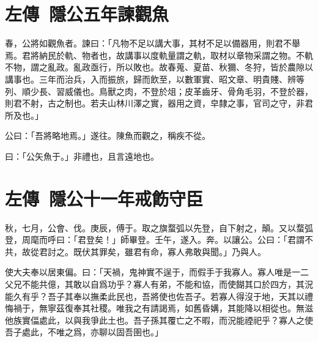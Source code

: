 \section[臧僖伯諫觀魚\quad{\small 左傳\ 隱公五年}]{{\normalsize 左傳\ 隱公五年}\quad {}諫觀魚}
春，公將如觀魚者。諫曰：「凡物不足以講大事，其材不足以備器用，則君不舉焉。君將納民於軌、物者也，故講事以度軌量謂之軌，取材以章物采謂之物。不軌不物，謂之亂政。亂政亟行，所以敗也。故春蒐、夏苗、秋獮、冬狩，皆於農隙以講事也。三年而治兵，入而振旅，歸而飲至，以數軍實、昭文章、明貴賤、辨等列、順少長、習威儀也。鳥獸之肉，不登於俎；皮革齒牙、骨角毛羽，不登於器，則{君}不射，古之制也。若夫山林川澤之實，器用之資，皁隸之事，官司之守，非君所及也。」

公曰：「吾將略地焉。」遂往。陳魚而觀之，稱疾不從。

曰：「公矢魚于。」非禮也，且言遠地也。

\theendnotes

\section[鄭莊公戒飭守臣\quad{\small 左傳\ 隱公十一年}]{{\normalsize 左傳\ 隱公十一年}\quad {}戒飭守臣}
秋，七月，公會、伐。庚辰，傅于。取之旗蝥弧以先登，自下射之，顛。又以蝥弧登，周麾而呼曰：「君登矣！」師畢登。壬午，遂入。奔。以讓公。公曰：「君謂不共，故從君討之。既伏其罪矣，雖君有命，寡人弗敢與聞。」乃與人。

使大夫奉以居東偏。曰：「天禍，鬼神實不逞于，而假手于我寡人。寡人唯是一二父兄不能共億，其敢以自爲功乎？寡人有弟，不能和協，而使餬其口於四方，其況能久有乎？吾子其奉以撫柔此民也，吾將使也佐吾子。若寡人得沒于地，天其以禮悔禍于，無寧茲復奉其社稷。唯我之有請謁焉，如舊昏媾，其能降以相從也。無滋他族實偪處此，以與我爭此土也。吾子孫其覆亡之不暇，而況能禋祀乎？寡人之使吾子處此，不唯之爲，亦聊以固吾圉也。」

